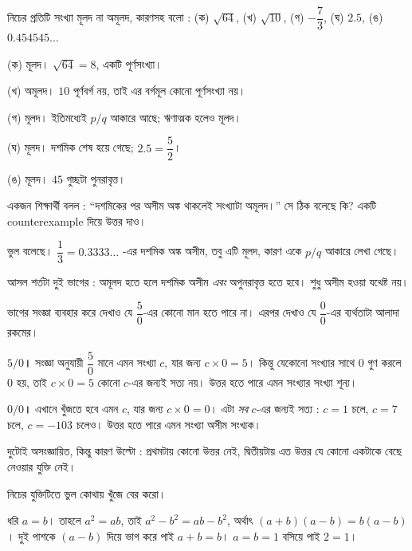 \documentclass[11pt]{article}
\begin{document}
 নিচের প্রতিটি সংখ্যা মূলদ না অমূলদ, কারণসহ বলো :
(ক) $\sqrt{64}$, \; (খ) $\sqrt{10}$, \; (গ) $-\dfrac{7}{3}$, \;
(ঘ) $2.5$, \; (ঙ) $0.454545\ldots$

\begin{sol}
(ক) মূলদ। $\sqrt{64} = 8$, একটি পূর্ণসংখ্যা।

(খ) অমূলদ। $10$ পূর্ণবর্গ নয়, তাই এর বর্গমূল কোনো পূর্ণসংখ্যা নয়।

(গ) মূলদ। ইতিমধ্যেই $p/q$ আকারে আছে; ঋণাত্মক হলেও মূলদ।

(ঘ) মূলদ। দশমিক শেষ হয়ে গেছে; $2.5 = \dfrac{5}{2}$।

(ঙ) মূলদ। $45$ গুচ্ছটা পুনরাবৃত্ত।
\end{sol}

 একজন শিক্ষার্থী বলল : ``দশমিকের পর অসীম অঙ্ক থাকলেই সংখ্যাটা অমূলদ।''
সে ঠিক বলেছে কি? একটি counterexample দিয়ে উত্তর দাও।

\begin{sol}
ভুল বলেছে। $\dfrac{1}{3} = 0.3333\ldots$ -এর দশমিক অঙ্ক অসীম, তবু এটি মূলদ,
কারণ একে $p/q$ আকারে লেখা গেছে।

আসল শর্তটা দুই ভাগের : অমূলদ হতে হলে দশমিক অসীম \emph{এবং} অপুনরাবৃত্ত হতে
হবে। শুধু অসীম হওয়া যথেষ্ট নয়।
\end{sol}

 ভাগের সংজ্ঞা ব্যবহার করে দেখাও যে $\dfrac{5}{0}$-এর কোনো মান হতে পারে
না। এরপর দেখাও যে $\dfrac{0}{0}$-এর ব্যর্থতাটা আলাদা রকমের।

\begin{sol}
\textbf{$5/0$।} সংজ্ঞা অনুযায়ী $\dfrac{5}{0}$ মানে এমন সংখ্যা $c$, যার জন্য
$c \times 0 = 5$। কিন্তু যেকোনো সংখ্যার সাথে $0$ গুণ করলে $0$ হয়, তাই
$c \times 0 = 5$ কোনো $c$-এর জন্যই সত্য নয়। উত্তর হতে পারে এমন সংখ্যার
সংখ্যা শূন্য।

\medskip
\textbf{$0/0$।} এখানে খুঁজতে হবে এমন $c$, যার জন্য $c \times 0 = 0$। এটা
\emph{সব} $c$-এর জন্যই সত্য : $c = 1$ চলে, $c = 7$ চলে, $c = -103$ চলেও।
উত্তর হতে পারে এমন সংখ্যা অসীম সংখ্যক।

\medskip
দুটোই অসংজ্ঞায়িত, কিন্তু কারণ উল্টো : প্রথমটায় কোনো উত্তর নেই, দ্বিতীয়টায়
এত উত্তর যে কোনো একটাকে বেছে নেওয়ার যুক্তি নেই।
\end{sol}

 নিচের যুক্তিটিতে ভুল কোথায় খুঁজে বের করো।

\smallskip
\noindent
ধরি $a = b$। তাহলে $a^2 = ab$, তাই $a^2 - b^2 = ab - b^2$, অর্থাৎ
$(a+b)(a-b) = b(a-b)$। দুই পাশকে $(a-b)$ দিয়ে ভাগ করে পাই $a + b = b$।
$a = b = 1$ বসিয়ে পাই $2 = 1$।
\end{document}
